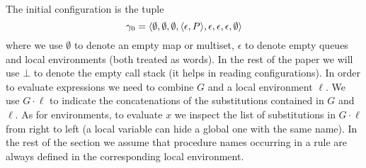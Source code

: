 The initial configuration  is the tuple 
$$\gamma_0=
\langle \emptyset,\emptyset,\emptyset,\langle \epsilon,P \rangle,\epsilon,\epsilon,\epsilon,\emptyset \rangle
$$
where we use $\emptyset$ to denote an empty map or multiset, 
$\epsilon$ to denote empty queues and local environments (both treated as words).
In the rest of the paper we will use $\bot$ to denote the empty call stack (it helps in reading configurations). In order to evaluate expressions we need to combine $G$ and a local environment $\ell$.
We use $G\cdot \ell$ to indicate the concatenations of the substitutions contained in $G$ and $\ell$.
As for environments, to evaluate $x$ we inspect the list of substitutions in $G\cdot\ell$ from right to left (a local variable can hide a global one with the same name).
In the rest of the section  we assume that procedure names occurring in a rule are always defined in the corresponding local environment.
